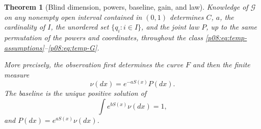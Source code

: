 \documentclass[11pt,letterpaper]{article}
\newtheorem{theorem}{Theorem}[section]
\theoremstyle{definition}
\theoremstyle{remark}
\newcommand{\1}{\mathbf 1}
\begin{document}
\begin{theorem}[Blind dimension, powers, baseline, gain, and law]
\label{p08:thm:temp-fully-blind}
Knowledge of $\mathcal G$ on any nonempty open interval contained in
$(0,1)$ determines $C$, $a$, the cardinality of $I$, the unordered set
$\{q_i:i\in I\}$, and the joint law $P$, up to the same permutation of
the powers and coordinates, throughout the class
\eqref{p08:eq:temp-assumptions}--\eqref{p08:eq:temp-G}.

More precisely, the observation first determines the curve $F$ and
then the finite measure
\begin{equation}\label{p08:eq:temp-nu}
             \nu(dx)=e^{-aS(x)}P(dx).
\end{equation}
The baseline is the unique positive solution of
\begin{equation}\label{p08:eq:temp-normalize}
                  \int e^{bS(x)}\nu(dx)=1,
\end{equation}
and $P(dx)=e^{aS(x)}\nu(dx)$.
\end{theorem}
\end{document}
